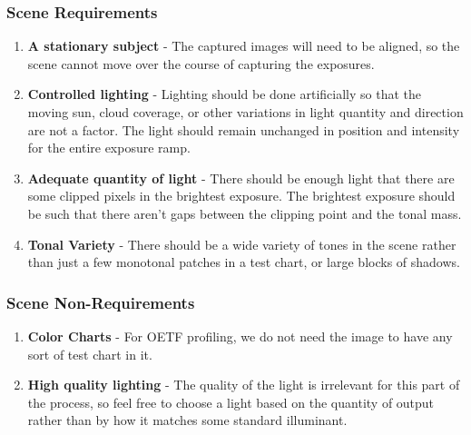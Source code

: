 \documentclass[twoside]{article}
\begin{document}
\subsubsection{Scene Requirements}
\begin{enumerate}
    \item \textbf{A stationary subject} - The captured images will need to be aligned, so the scene cannot move over the course of capturing the exposures.
    \item \textbf{Controlled lighting} - Lighting should be done artificially so that the moving sun, cloud coverage, or other variations in light quantity and direction are not a factor. The light should remain unchanged in position and intensity for the entire exposure ramp.
    \item \textbf{Adequate quantity of light} - There should be enough light that there are some clipped pixels in the brightest exposure. The brightest exposure should be such that there aren't gaps between the clipping point and the tonal mass.
    \item \textbf{Tonal Variety} - There should be a wide variety of tones in the scene rather than just a few monotonal patches in a test chart, or large blocks of shadows.
\end{enumerate}

\subsubsection{Scene Non-Requirements}
\begin{enumerate}
    \item \textbf{Color Charts} - For OETF profiling, we do not need the image to have any sort of test chart in it.
    \item \textbf{High quality lighting} - The quality of the light is irrelevant for this part of the process, so feel free to choose a light based on the quantity of output rather than by how it matches some standard illuminant.
\end{enumerate}
\end{document}
